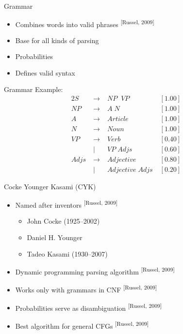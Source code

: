 \documentclass[14pt]{beamer}
\theoremstyle{remark}
\begin{document}
\begin{frame}[t]{Grammar}
	\begin{itemize}
		\item Combines words into valid phrases \textsuperscript{[Russel, 2009]}
		\item Base for all kinds of parsing
		\item Probabilities
		\item Defines valid syntax
	\end{itemize}
\end{frame}
\begin{frame}[t,fragile]{Grammar}
	Example:
	\begin{alignat*}{2}
				S \;&\rightarrow &\; NP\;\;VP \;&[1.00] \\
				NP \;&\rightarrow &\; A\;N \;&[1.00]\\
				A \;&\rightarrow &\; Article\;&[1.00]\\
				N \;&\rightarrow &\; Noun\;&[1.00]\\
				VP \;&\rightarrow &\; Verb \;&[0.40] \\
				\;&|&\; VP\;Adjs \;&[0.60] \\
				Adjs \;&\rightarrow &\; Adjective \;&[0.80] \\
				\;&|&\; Adjective\;Adjs \;&[0.20]
			\end{alignat*}
\end{frame}

\begin{frame}[t]{Cocke Younger Kasami (CYK)}
	\begin{itemize}
		\item Named after inventors \textsuperscript{[Russel, 2009]}
		\begin{itemize}
			\item John Cocke (1925--2002)
			\item Daniel H. Younger
			\item Tadeo Kasami (1930--2007)
		\end{itemize}
		\item Dynamic programming parsing algorithm \textsuperscript{[Russel, 2009]}
		\item Works only with grammars in CNF \textsuperscript{[Russel, 2009]}
		\item Probabilities serve as disambiguation \textsuperscript{[Russel, 2009]}
		\item Best algorithm for general CFGs \textsuperscript{[Russel, 2009]}
	\end{itemize}
\end{frame}
\end{document}
